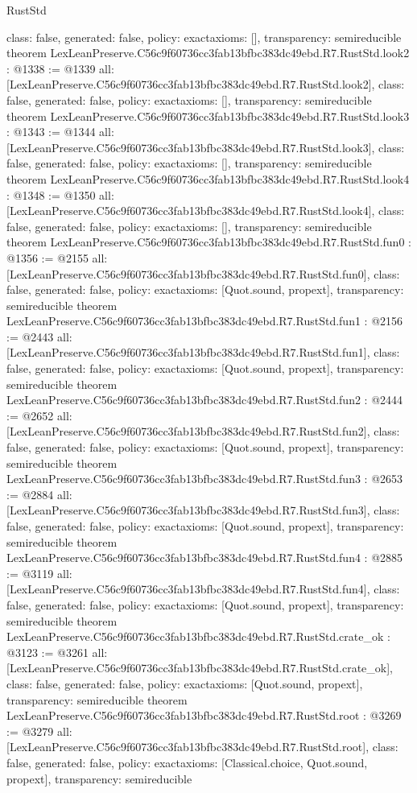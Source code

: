 \begin{lexlean}{RustStd}
\begin{coremodule}
{  class: false,
  generated: false,
  policy: exact{axioms: []},
  transparency: semireducible
}
theorem LexLeanPreserve.C56c9f60736cc3fab13bfbc383dc49ebd.R7.RustStd.look2 : @1338 := @1339 {
  all: [LexLeanPreserve.C56c9f60736cc3fab13bfbc383dc49ebd.R7.RustStd.look2],
  class: false,
  generated: false,
  policy: exact{axioms: []},
  transparency: semireducible
}
theorem LexLeanPreserve.C56c9f60736cc3fab13bfbc383dc49ebd.R7.RustStd.look3 : @1343 := @1344 {
  all: [LexLeanPreserve.C56c9f60736cc3fab13bfbc383dc49ebd.R7.RustStd.look3],
  class: false,
  generated: false,
  policy: exact{axioms: []},
  transparency: semireducible
}
theorem LexLeanPreserve.C56c9f60736cc3fab13bfbc383dc49ebd.R7.RustStd.look4 : @1348 := @1350 {
  all: [LexLeanPreserve.C56c9f60736cc3fab13bfbc383dc49ebd.R7.RustStd.look4],
  class: false,
  generated: false,
  policy: exact{axioms: []},
  transparency: semireducible
}
theorem LexLeanPreserve.C56c9f60736cc3fab13bfbc383dc49ebd.R7.RustStd.fun0 : @1356 := @2155 {
  all: [LexLeanPreserve.C56c9f60736cc3fab13bfbc383dc49ebd.R7.RustStd.fun0],
  class: false,
  generated: false,
  policy: exact{axioms: [Quot.sound, propext]},
  transparency: semireducible
}
theorem LexLeanPreserve.C56c9f60736cc3fab13bfbc383dc49ebd.R7.RustStd.fun1 : @2156 := @2443 {
  all: [LexLeanPreserve.C56c9f60736cc3fab13bfbc383dc49ebd.R7.RustStd.fun1],
  class: false,
  generated: false,
  policy: exact{axioms: [Quot.sound, propext]},
  transparency: semireducible
}
theorem LexLeanPreserve.C56c9f60736cc3fab13bfbc383dc49ebd.R7.RustStd.fun2 : @2444 := @2652 {
  all: [LexLeanPreserve.C56c9f60736cc3fab13bfbc383dc49ebd.R7.RustStd.fun2],
  class: false,
  generated: false,
  policy: exact{axioms: [Quot.sound, propext]},
  transparency: semireducible
}
theorem LexLeanPreserve.C56c9f60736cc3fab13bfbc383dc49ebd.R7.RustStd.fun3 : @2653 := @2884 {
  all: [LexLeanPreserve.C56c9f60736cc3fab13bfbc383dc49ebd.R7.RustStd.fun3],
  class: false,
  generated: false,
  policy: exact{axioms: [Quot.sound, propext]},
  transparency: semireducible
}
theorem LexLeanPreserve.C56c9f60736cc3fab13bfbc383dc49ebd.R7.RustStd.fun4 : @2885 := @3119 {
  all: [LexLeanPreserve.C56c9f60736cc3fab13bfbc383dc49ebd.R7.RustStd.fun4],
  class: false,
  generated: false,
  policy: exact{axioms: [Quot.sound, propext]},
  transparency: semireducible
}
theorem LexLeanPreserve.C56c9f60736cc3fab13bfbc383dc49ebd.R7.RustStd.crate_ok : @3123 := @3261 {
  all: [LexLeanPreserve.C56c9f60736cc3fab13bfbc383dc49ebd.R7.RustStd.crate_ok],
  class: false,
  generated: false,
  policy: exact{axioms: [Quot.sound, propext]},
  transparency: semireducible
}
theorem LexLeanPreserve.C56c9f60736cc3fab13bfbc383dc49ebd.R7.RustStd.root : @3269 := @3279 {
  all: [LexLeanPreserve.C56c9f60736cc3fab13bfbc383dc49ebd.R7.RustStd.root],
  class: false,
  generated: false,
  policy: exact{axioms: [Classical.choice, Quot.sound, propext]},
  transparency: semireducible
}


\end{coremodule}
\end{lexlean}

